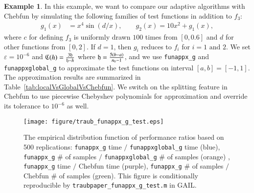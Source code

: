 \documentclass[review]{elsarticle}
\newcommand{\abstol}{\varepsilon}
\theoremstyle{definition}
\newtheorem{exmp}{Example}
\newcommand{\funappxg}{\texttt{funappx\_g}\xspace}
\newcommand{\funappxglobalg}{\texttt{funappxglobal\_g\xspace}}
\begin{document}
\begin{exmp}
In this example, we want to compare our adaptive algorithms with Chebfun by
simulating the following families of test functions in addition to $f_3$:
%
\begin{align*}
 g_1(x) &= x^4 \sin(d/x), \qquad
 g_2(x) = 10  x^2 + g_1(x),
\end{align*}
where $c$ for defining $f_3$ is uniformly drawn $100$ times from $[0,0.6]$ and
$d$ for other functions from $[0,2]$. If $d=1$, then  $g_i$ reduces to $f_i$ for
$i=1 \mbox{ and } 2$.
We set $\abstol = 10^{-6}$ and $\mathfrak{C}
(h) = \frac{ 3 \mathfrak{h}}{\mathfrak{h}-h}$ where $\mathfrak{h} = \frac{5(b-a)}{n_0-1}$, and we use
\texttt{funappx\_g} and \texttt{funappxglobal\_g} to approximate the test
functions on interval $[a,b]=[-1,1]$. The approximation results are
summarized in Table~\ref{tab:localVsGlobalVsChebfun}. We switch on the splitting
feature in Chebfun to use piecewise Chebyshev polynomials for approximation and override its tolerance to $10^{-6}$ as well.

%
\begin{figure}[tb]
  \centering
\texttt{[image: figure/traub\_funappx\_g\_test.eps]}
\caption{The empirical distribution function of performance ratios based on 500 replications:  \funappxg{} time $/$ \funappxglobalg{} time (blue), \funappxg{} \# of samples $/$ \funappxglobalg{} \# of samples (orange) ,   \funappxg{} time $/$ Chebfun time (purple), \funappxg{} \# of samples $/$ Chebfun \# of samples (green). This figure is conditionally reproducible by
\texttt{traubpaper\_funappx\_g\_test.m} in GAIL.}
  \label{fig:testfunctions}
\end{figure}


\end{exmp}
\end{document}
